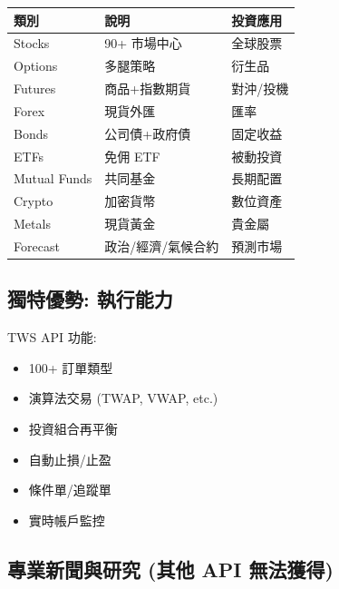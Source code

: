 \documentclass[11pt,a4paper]{article}
\begin{document}
\begin{table}[H]
\centering
\begin{tabular}{@{}lll@{}}
\toprule
\textbf{類別} & \textbf{說明} & \textbf{投資應用} \\
\midrule
Stocks & 90+ 市場中心 & 全球股票 \\
Options & 多腿策略 & 衍生品 \\
Futures & 商品+指數期貨 & 對沖/投機 \\
Forex & 現貨外匯 & 匯率 \\
Bonds & 公司債+政府債 & 固定收益 \\
ETFs & 免佣 ETF & 被動投資 \\
Mutual Funds & 共同基金 & 長期配置 \\
Crypto & 加密貨幣 & 數位資產 \\
Metals & 現貨黃金 & 貴金屬 \\
Forecast & 政治/經濟/氣候合約 & 預測市場 \\
\bottomrule
\end{tabular}
\end{table}

\subsection{獨特優勢: 執行能力}

\begin{tcolorbox}[colback=ibkrblue!5,colframe=ibkrblue,title={\textbf{這是唯一能實際執行交易的選項！}}]
TWS API 功能:
\begin{itemize}[leftmargin=*]
    \item 100+ 訂單類型
    \item 演算法交易 (TWAP, VWAP, etc.)
    \item 投資組合再平衡
    \item 自動止損/止盈
    \item 條件單/追蹤單
    \item 實時帳戶監控
\end{itemize}
\end{tcolorbox}

\subsection{專業新聞與研究 (其他 API 無法獲得)}
\end{document}
